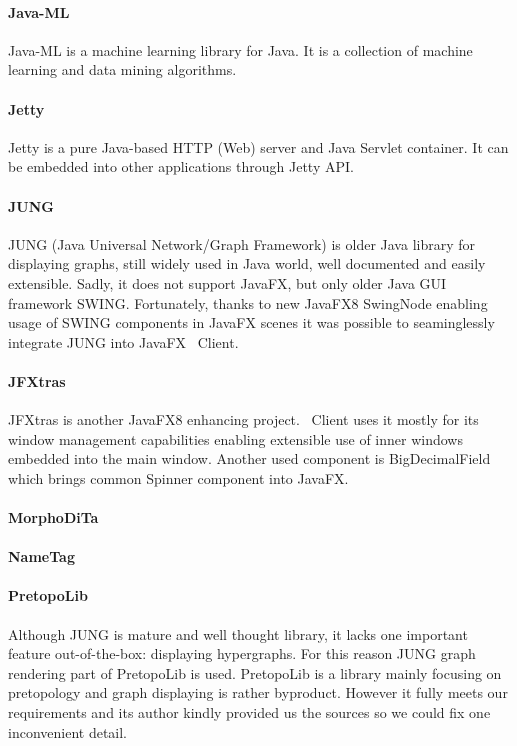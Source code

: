 \paragraph{Java-ML}
Java-ML is a machine learning library for Java. It is a collection of machine
learning and data mining algorithms.

\paragraph{Jetty}
Jetty is a pure Java-based HTTP (Web) server and Java Servlet container. It can
be embedded into other applications through Jetty API.

\paragraph{JUNG}
JUNG (Java Universal Network/Graph Framework) is older Java library for
displaying graphs, still widely used in Java world, well documented and easily
extensible. Sadly, it does not support JavaFX, but only older Java GUI framework
SWING. Fortunately, thanks to new JavaFX8 SwingNode enabling usage of SWING
components in JavaFX scenes it was possible to seaminglessly integrate JUNG into
JavaFX \textan\ Client.

\paragraph{JFXtras}
JFXtras is another JavaFX8 enhancing project. \textan\ Client uses it mostly for
its window management capabilities enabling extensible use of inner windows
embedded into the main window. Another used component is BigDecimalField which
brings common Spinner component into JavaFX.

\paragraph{MorphoDiTa}

\paragraph{NameTag}

\paragraph{PretopoLib}
Although JUNG is mature and well thought library, it lacks one important feature
out-of-the-box: displaying hypergraphs. For this reason JUNG graph rendering
part of PretopoLib is used. PretopoLib is a library mainly focusing on
pretopology and graph displaying is rather byproduct. However it fully meets our
requirements and its author kindly provided us the sources so we could fix one
inconvenient detail.

